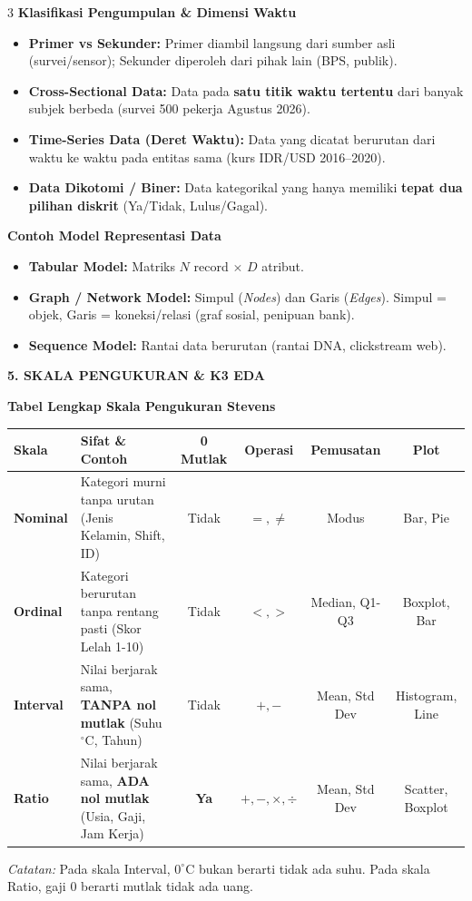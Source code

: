 \documentclass[6.8pt,landscape,a4paper]{extarticle}
\newcommand{\sdtSection}[2][sdtNavy]{%
    \vspace{0.6pt}%
    \noindent\colorbox{#1}{%
        \parbox{\dimexpr\linewidth-2\fboxsep\relax}{%
            \textbf{\fontsize{6.5pt}{7.5pt}\selectfont\color{white}#2}%
        }%
    }\vspace{0.3pt}%
}
\newcommand{\sdtSub}[1]{%
    \vspace{0.5pt}%
    \noindent\textbf{\fontsize{5.8pt}{6.8pt}\selectfont\color{sdtBlue}#1}\vspace{0.1pt}%
}
\begin{document}
\begin{multicols}{3}
\sdtSub{Klasifikasi Pengumpulan \& Dimensi Waktu}
\begin{itemize}
    \item \textbf{Primer vs Sekunder:} Primer diambil langsung dari sumber asli (survei/sensor); Sekunder diperoleh dari pihak lain (BPS, publik).
    \item \textbf{Cross-Sectional Data:} Data pada \textbf{satu titik waktu tertentu} dari banyak subjek berbeda (survei 500 pekerja Agustus 2026).
    \item \textbf{Time-Series Data (Deret Waktu):} Data yang dicatat berurutan dari waktu ke waktu pada entitas sama (kurs IDR/USD 2016--2020).
    \item \textbf{Data Dikotomi / Biner:} Data kategorikal yang hanya memiliki \textbf{tepat dua pilihan diskrit} (Ya/Tidak, Lulus/Gagal).
\end{itemize}

\sdtSub{Contoh Model Representasi Data}
\begin{itemize}
    \item \textbf{Tabular Model:} Matriks $N$ record $\times$ $D$ atribut.
    \item \textbf{Graph / Network Model:} Simpul (\textit{Nodes}) dan Garis (\textit{Edges}). Simpul = objek, Garis = koneksi/relasi (graf sosial, penipuan bank).
    \item \textbf{Sequence Model:} Rantai data berurutan (rantai DNA, clickstream web).
\end{itemize}



\sdtSection{5. SKALA PENGUKURAN \& K3 EDA}

\sdtSub{Tabel Lengkap Skala Pengukuran Stevens}
\begin{center}
{\fontsize{4.8pt}{5.8pt}\selectfont
\begin{tabularx}{\linewidth}{@{}lXcccc@{}}
\toprule
\textbf{Skala} & \textbf{Sifat \& Contoh} & \textbf{0 Mutlak} & \textbf{Operasi} & \textbf{Pemusatan} & \textbf{Plot} \\
\midrule
\textbf{Nominal} & Kategori murni tanpa urutan (Jenis Kelamin, Shift, ID) & Tidak & $=, \neq$ & Modus & Bar, Pie \\
\textbf{Ordinal} & Kategori berurutan tanpa rentang pasti (Skor Lelah 1-10) & Tidak & $<, >$ & Median, Q1-Q3 & Boxplot, Bar \\
\textbf{Interval} & Nilai berjarak sama, \textbf{TANPA nol mutlak} (Suhu $^\circ$C, Tahun) & Tidak & $+,-$ & Mean, Std Dev & Histogram, Line \\
\textbf{Ratio} & Nilai berjarak sama, \textbf{ADA nol mutlak} (Usia, Gaji, Jam Kerja) & \textbf{Ya} & $+,-,\times,\div$ & Mean, Std Dev & Scatter, Boxplot \\
\bottomrule
\end{tabularx}}
\end{center}
\textit{Catatan:} Pada skala Interval, $0^\circ\text{C}$ bukan berarti tidak ada suhu. Pada skala Ratio, gaji 0 berarti mutlak tidak ada uang.


\end{multicols}
\end{document}
